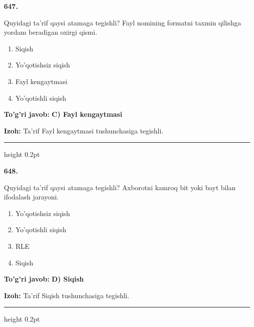 \documentclass[10pt,a4paper,oneside]{article}
\begin{document}
\noindent\textbf{\color{ink}647.}
\par
Quyidagi ta'rif qaysi atamaga tegishli? Fayl nomining formatni taxmin qilishga yordam beradigan oxirgi qismi.
\begin{enumerate}[label=\Alph*),leftmargin=9mm]
\item Siqish
\item Yo'qotishsiz siqish
\item Fayl kengaytmasi
\item Yo'qotishli siqish
\end{enumerate}
\begin{tcolorbox}[enhanced,breakable,colback=teal!4,colframe=teal!50!black,boxrule=0.5pt,arc=1.1mm,left=3mm,right=3mm,top=1.7mm,bottom=1.7mm,before skip=2mm,after skip=2mm]
\textbf{\color{teal}To'g'ri javob:} \textbf{C) Fayl kengaytmasi}
\par\smallskip
\textbf{Izoh:} Ta'rif Fayl kengaytmasi tushunchasiga tegishli.
\end{tcolorbox}
\vspace{2mm}\hrule height 0.2pt \vspace{3mm}

\noindent\textbf{\color{ink}648.}
\par
Quyidagi ta'rif qaysi atamaga tegishli? Axborotni kamroq bit yoki bayt bilan ifodalash jarayoni.
\begin{enumerate}[label=\Alph*),leftmargin=9mm]
\item Yo'qotishsiz siqish
\item Yo'qotishli siqish
\item RLE
\item Siqish
\end{enumerate}
\begin{tcolorbox}[enhanced,breakable,colback=teal!4,colframe=teal!50!black,boxrule=0.5pt,arc=1.1mm,left=3mm,right=3mm,top=1.7mm,bottom=1.7mm,before skip=2mm,after skip=2mm]
\textbf{\color{teal}To'g'ri javob:} \textbf{D) Siqish}
\par\smallskip
\textbf{Izoh:} Ta'rif Siqish tushunchasiga tegishli.
\end{tcolorbox}
\vspace{2mm}\hrule height 0.2pt \vspace{3mm}
\end{document}
